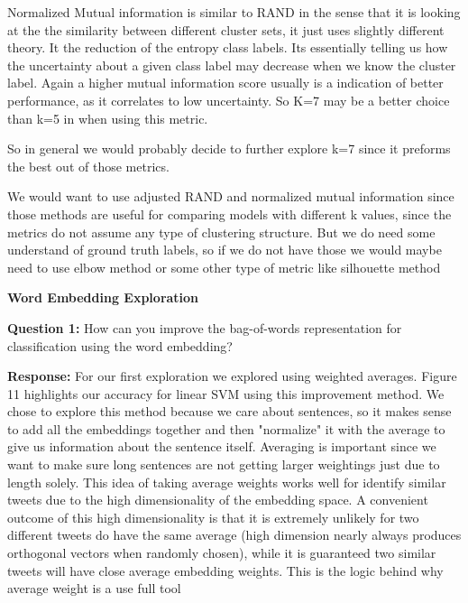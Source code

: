 \documentclass[12pt,article]{article}
\begin{document}
Normalized Mutual information is similar to RAND in the sense that it is looking at the the similarity between different cluster sets, it just uses slightly different theory. It the reduction of the entropy class labels. Its essentially telling us how the uncertainty about a given class label may decrease when we know the cluster label. Again a higher mutual information score usually is a indication of better performance, as it correlates to low uncertainty.  So K=7 may be a better choice than k=5 in when using this metric. \newline 

So in general we would probably decide to further explore k=7 since it preforms the best out of those metrics.\newline

We would want to use adjusted RAND and normalized mutual information since those methods are useful for comparing models with different k values, since the metrics do not assume any type of clustering structure. But we do need some understand of ground truth labels, so if we do not have those we would maybe need to use elbow method or some other type of metric like silhouette method \newline
\begin{center} \Large{\textbf{Word Embedding Exploration }} \end{center}

\textbf{Question 1:}\newline
How can you improve the bag-of-words representation for classification using the word embedding?\newline

\textbf{Response:}
For our first exploration we explored using weighted averages. Figure 11 highlights our accuracy for linear SVM using this improvement method. We chose to explore this method because we care about sentences, so it makes sense to add all the embeddings together and then "normalize" it with the average to give us information about the sentence itself. Averaging is important since we want to make sure long sentences are not getting larger weightings just due to length solely. This idea of taking average weights works well for identify similar tweets due to the high dimensionality of the embedding space. A convenient outcome of this high dimensionality is that it is extremely unlikely for two different tweets do have the same average (high dimension nearly always produces orthogonal vectors when randomly chosen), while it is guaranteed two similar tweets will have close average embedding weights. This is the logic behind why average weight is a use full tool\newline
\end{document}
